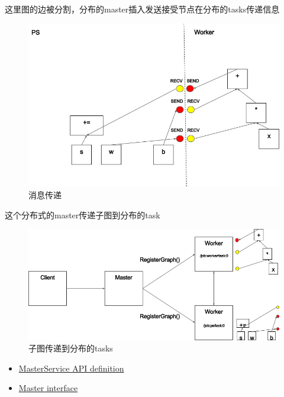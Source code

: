 \documentclass{book}
\begin{document}
这里图的边被分割，分布的master插入发送接受节点在分布的tasks传递信息
\begin{figure}[H]
	\centering 
	\includegraphics[scale=0.5]{graph_split2.jpg}
	\caption{消息传递}
	\label{fig:tf_ext6}
\end{figure}
这个分布式的master传递子图到分布的task
\begin{figure}[H]
	\centering 
	\includegraphics[scale=0.5]{graph_workers_cln.jpg}
	\caption{子图传递到分布的tasks}
	\label{fig:tf_ext7}
\end{figure}
\begin{itemize}
		\item \href{https://www.github.com/tensorflow/tensorflow/blob/r1.4/tensorflow/core/protobuf/master_service.proto}{MasterService API definition}
		\item \href{https://www.github.com/tensorflow/tensorflow/blob/r1.4/tensorflow/core/distributed_runtime/master_interface.h}{Master interface}
\end{itemize}
\end{document}
